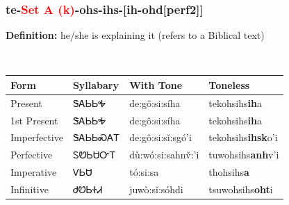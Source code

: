 \subsubsection*{te{-}\textcolor{Red}{Set A (k)}{-}\textbf{ohs}{-}ihs{-}[ih-ohd[perf2]]}
\nopagebreak
\textbf{Definition: } he/she is explaining it (refers to a Biblical text)
\\[0.5em]
\begin{tabularx}{\textwidth}{l X X X}%
\toprule%
\textbf{Form}&\textbf{Syllabary}&\textbf{With Tone}&\textbf{Toneless}\\%
\midrule%
Present&ᏕᎪᏏᏏᎭ&de:gô:si:síha&tekohsihs\textbf{ih}a\\%
1st Present&ᏕᎪᏏᏏᎭ&de:gô:si:síha&tekohsihs\textbf{ih}a\\%
Imperfective&ᏕᎪᏏᏏᏍᎪᎢ&de:gô:si:sǐ:sgó’i&tekohsihs\textbf{ihsk}o'i\\%
Perfective&ᏚᏬᏏᏌᏅᎢ&dù:wó:si:sahnv̌:’i&tuwohsihs\textbf{anh}v'i\\%
Imperative&ᏙᏏᏌ&tó:si:sa&thohsihs\textbf{a}\\%
Infinitive&ᏧᏬᏏᏐᏗ&juwò:sǐ:sóhdi&tsuwohsihs\textbf{oht}i\\%
\bottomrule%
\end{tabularx}
\\[1em]